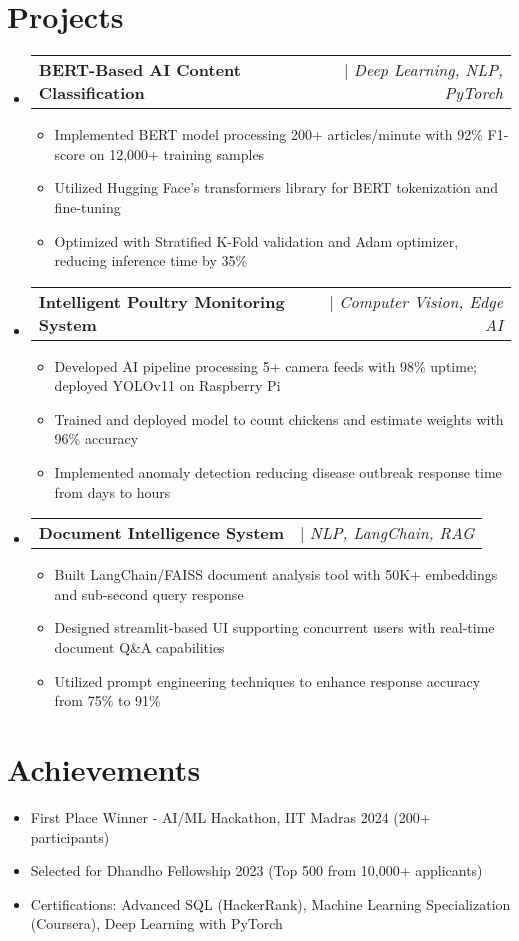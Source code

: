 \documentclass[letterpaper,10.8pt]{article}
\makeatletter
\newcommand{\resumeItem}[1]{
  \item\small{#1}
}
\newcommand{\resumeProjectHeading}[2]{
  \item
  \begin{tabular*}{0.97\textwidth}{l@{\extracolsep{\fill}}r}
    \small#1 & #2 \\
  \end{tabular*}\vspace{-3pt}
}
\newcommand{\resumeSubHeadingListStart}{\begin{itemize}[leftmargin=0.15in, label={}, itemsep=2pt]}
\newcommand{\resumeSubHeadingListEnd}{\end{itemize}\vspace{0pt}}
\newcommand{\resumeItemListStart}{\begin{itemize}[leftmargin=*,itemsep=2pt,parsep=0pt,topsep=1pt]}
\newcommand{\resumeItemListEnd}{\end{itemize}\vspace{0pt}}
\makeatother
\begin{document}
\section{Projects}
\resumeSubHeadingListStart
  \resumeProjectHeading
      {\textbf{BERT-Based AI Content Classification}}{$|$ \emph{Deep Learning, NLP, PyTorch}}
      \resumeItemListStart
        \resumeItem{Implemented BERT model processing 200+ articles/minute with 92\% F1-score on 12,000+ training samples}
        \resumeItem{Utilized Hugging Face's transformers library for BERT tokenization and fine-tuning}
        \resumeItem{Optimized with Stratified K-Fold validation and Adam optimizer, reducing inference time by 35\%}
      \resumeItemListEnd
  \resumeProjectHeading
    {\textbf{Intelligent Poultry Monitoring System}}
    {$|$ \emph{Computer Vision, Edge AI}}
    \resumeItemListStart
        \resumeItem{Developed AI pipeline processing 5+ camera feeds with 98\% uptime; deployed YOLOv11 on Raspberry Pi}
        \resumeItem{Trained and deployed model to count chickens and estimate weights with 96\% accuracy}
        \resumeItem{Implemented anomaly detection reducing disease outbreak response time from days to hours}
    \resumeItemListEnd
  \resumeProjectHeading
      {\textbf{Document Intelligence System}}
      {$|$ \emph{NLP, LangChain, RAG}}
      \resumeItemListStart
          \resumeItem{Built LangChain/FAISS document analysis tool with 50K+ embeddings and sub-second query response}
          \resumeItem{Designed streamlit-based UI supporting concurrent users with real-time document Q\&A capabilities}
          \resumeItem{Utilized prompt engineering techniques to enhance response accuracy from 75\% to 91\%}
      \resumeItemListEnd
\resumeSubHeadingListEnd

\section{Achievements}
\resumeItemListStart
    \resumeItem{First Place Winner - AI/ML Hackathon, IIT Madras 2024 (200+ participants)}
    \resumeItem{Selected for Dhandho Fellowship 2023 (Top 500 from 10,000+ applicants)}
    \resumeItem{Certifications: Advanced SQL (HackerRank), Machine Learning Specialization (Coursera), Deep Learning with PyTorch}
\resumeItemListEnd
\end{document}
